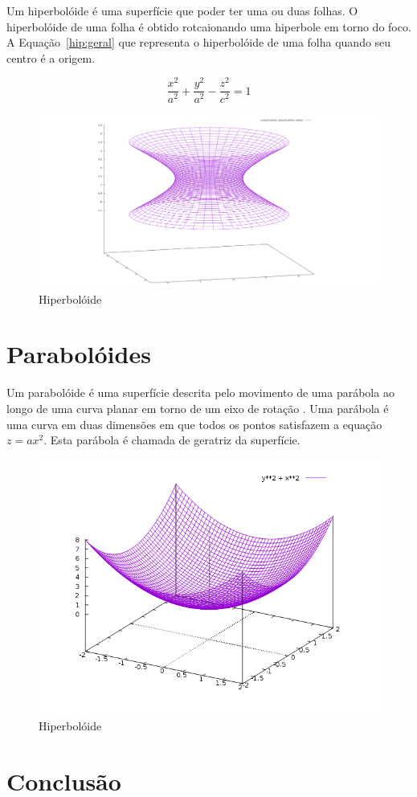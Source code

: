 \documentclass[
	article,			%
	11pt,				%
	oneside,			%
	a4paper,			%
	english,			%
	brazil,				%
	]{abntex2}
\begin{document}
		Um hiperbolóide é uma superfície que poder ter uma ou duas folhas. O
		hiperbolóide de uma folha é obtido rotcaionando uma hiperbole em torno
		do foco. A Equação~\ref{hip:geral} que representa o hiperbolóide de uma
		folha quando seu centro é a origem.

		\begin{equation}\label{hip:geral}
			\frac{x^2}{a^2}+\frac{y^2}{a^2}-\frac{z^2}{c^2}=1
		\end{equation}

		\begin{figure}[!htb]
			\includegraphics[width=\textwidth,keepaspectratio]{hyperboloid.png}
			\caption{Hiperbolóide}
			\label{img:hip}
		\end{figure}

	\section{Parabolóides}

		Um parabolóide é uma superfície descrita pelo movimento de uma parábola
		ao longo de uma curva planar em torno de um eixo de rotação . Uma
		parábola é uma curva em duas dimensões em que todos os pontos satisfazem
		a equação $z = ax^2$. Esta parábola é chamada de geratriz da superfície.

				\begin{figure}[!htb]
					\includegraphics[width=\textwidth,keepaspectratio]{paraboloid.png}
					\caption{Hiperbolóide}
					\label{img:parab}
				\end{figure}

	\section{Conclusão}
    
	

	\nocite{winterle2000vetores}
	
\end{document}
